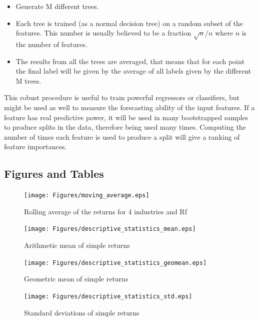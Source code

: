 \documentclass[a4paper]{article}
\begin{document}
\begin{itemize}
	\item Generate M different trees.
	\item Each tree is trained (as a normal decision tree) on a random subset of the features. This number is usually believed to be a fraction $\sqrt{n}/n$ where $n$ is the number of features.
	\item The results from all the trees are averaged, that means that for each point the final label will be given by the average of all labels given by the different M trees. 
\end{itemize}

This robust procedure is useful to train powerful regressors or classifiers, but might be used as well to measure the forecasting ability of the input features. If a feature has real predictive power, it will be used in many bootstrapped samples to produce splits in the data, therefore being used many times. Computing the number of times each feature is used to produce a split will give a ranking of feature importances.\\

\newpage
\subsection*{Figures and Tables}

\begin{figure}[htbp]
	\centering
	\texttt{[image: Figures/moving\_average.eps]}
	\caption{Rolling average of the returns for 4 industries and Rf}
	\label{rolling_average}
\end{figure}

\begin{figure}[htbp]
	\centering
	\texttt{[image: Figures/descriptive\_statistics\_mean.eps]}
	\caption{Arithmetic mean of simple returns}
	\label{simple_means}
\end{figure}

\begin{figure}[htbp]
	\centering
	\texttt{[image: Figures/descriptive\_statistics\_geomean.eps]}
	\caption{Geometric mean of simple returns}
	\label{simple_geomeans}
\end{figure}

\begin{figure}[htbp]
	\centering
	\texttt{[image: Figures/descriptive\_statistics\_std.eps]}
	\caption{Standard deviations of simple returns}
	\label{simple_std}
\end{figure}
\end{document}
